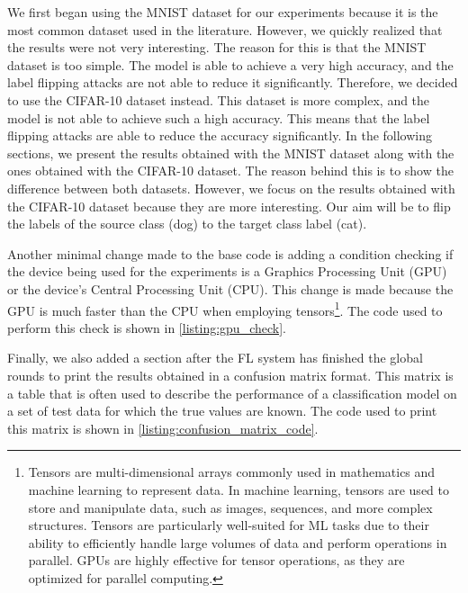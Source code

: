We first began using the MNIST dataset for our experiments because it is the most common dataset used in the literature. However, we quickly realized that the results were not very interesting. The reason for this is that the MNIST dataset is too simple. The model is able to achieve a very high accuracy, and the label flipping attacks are not able to reduce it significantly. Therefore, we decided to use the CIFAR-10 dataset instead. This dataset is more complex, and the model is not able to achieve such a high accuracy. This means that the label flipping attacks are able to reduce the accuracy significantly. In the following sections, we present the results obtained with the MNIST dataset along with the ones obtained with the CIFAR-10 dataset. The reason behind this is to show the difference between both datasets. However, we focus on the results obtained with the CIFAR-10 dataset because they are more interesting. Our aim will be to flip the labels of the source class (dog) to the target class label (cat). 

Another minimal change made to the base code is adding a condition checking if the device being used for the experiments is a Graphics Processing Unit (GPU) or the device's Central Processing Unit (CPU). This change is made because the GPU is much faster than the CPU when employing tensors\footnote{Tensors are multi-dimensional arrays commonly used in mathematics and machine learning to represent data. In machine learning, tensors are used to store and manipulate data, such as images, sequences, and more complex structures. Tensors are particularly well-suited for ML tasks due to their ability to efficiently handle large volumes of data and perform operations in parallel. GPUs are highly effective for tensor operations, as they are optimized for parallel computing.}. The code used to perform this check is shown in \autoref{listing:gpu_check}.

Finally, we also added a section after the FL system has finished the global rounds to print the results obtained in a confusion matrix format. This matrix is a table that is often used to describe the performance of a classification model on a set of test data for which the true values are known. The code used to print this matrix is shown in \autoref{listing:confusion_matrix_code}.


